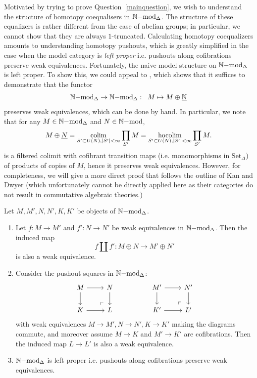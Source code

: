 Motivated by trying to prove Question~\ref{mainquestion}, we wish to understand the structure of homotopy coequalisers in ${\mathbb{N}\mathrm{-mod}}_{\Delta}$. 
The structure of these equalizers is rather different from the case of abelian groups; in particular, we cannot show that they are always $1$-truncated. 
Calculating homotopy coequalizers amounts to understanding homotopy pushouts, which is greatly simplified in the case when the model category
is \textit{left proper} i.e. pushouts along cofibrations preserve weak equivalences. Fortunately, the naive model structure on ${\mathbb{N}\mathrm{-mod}}_{\Delta}$ is left proper. To show this, we could appeal to 
\cite[Theorem 8.1]{rezksemi}, which shows that it suffices to demonstrate that the functor 
\[ {\mathbb{N}\mathrm{-mod}}_{\Delta} \rightarrow {\mathbb{N}\mathrm{-mod}}_{\Delta}: \; \; M \mapsto M \oplus \underline{\mathbb{N}}\]
preserves weak equivalences, which can be done by hand. In particular, we note that for any $M \in {\mathbb{N}\mathrm{-mod}}_{\Delta}$ and $N \in {\mathbb{N}}\mathrm{-mod}$,
\[M \oplus \underline{N} =\operatorname*{colim}_{S' \subset U(N), |S'| < \infty} \prod_{S'} M = \operatorname*{hocolim}_{S' \subset U(N), |S'| < \infty} \prod_{S'} M.\]
is a filtered colimit with cofibrant transition maps (i.e. monomorphisms in $\text{Set}_{\Delta}$) of products of copies of $M$, hence it preserves weak equivalences.
However, for completeness, we will give a more direct proof that follows the outline of Kan and Dwyer \cite{kansemi} 
(which unfortunately cannot be directly applied here as their categories do not result in commutative algebraic theories.)
\begin{proposition}
Let $M, M', N, N', K, K'$ be objects of ${\mathbb{N}\mathrm{-mod}}_{\Delta}$. 
\begin{enumerate}
\item[(i)]Let $f: M \to M'$ and $f': N \to N'$ be weak equivalences in ${\mathbb{N}\mathrm{-mod}}_{\Delta}$. 
Then the induced map
\[f \amalg f': M \oplus N \to M' \oplus N'\]
is also a weak equivalence.
\item[(ii)] Consider the pushout squares in ${\mathbb{N}\mathrm{-mod}}_{\Delta}$:
\[\begin{tikzcd}
M \arrow[r] \arrow[d] 
  & N \arrow[d] 
  && 
M' \arrow[r] \arrow[d] 
  & N' \arrow[d] \\
K \arrow[r] 
  & L
  \arrow[ul, phantom, "\ulcorner", very near start]
  &&
K' \arrow[r] 
  & L'
  \arrow[ul, phantom, "\ulcorner", very near start]
\end{tikzcd}\]
with weak equivalences $M \to M', N\to N', K\to K'$ making the diagrams commute, and moreover assume $M \to K$ and $M' \to K'$ are cofibrations.
Then the induced map $L \to L'$ is also a weak equivalence.
\item[(iii)]${\mathbb{N}\mathrm{-mod}}_{\Delta}$ is left proper i.e. pushouts along cofibrations preserve weak equivalences.
\end{enumerate}
\end{proposition}
